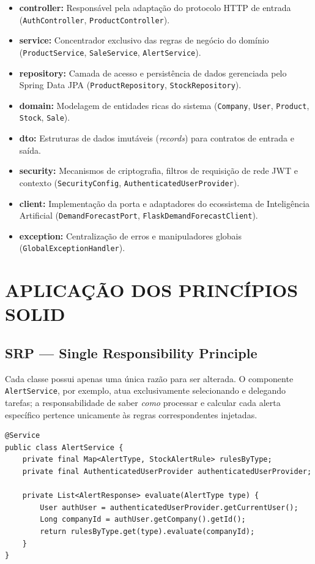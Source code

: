 \documentclass[12pt,a4paper]{article}
\begin{document}
\begin{itemize}
    \item \textbf{controller:} Responsável pela adaptação do protocolo HTTP de entrada (\texttt{AuthController}, \texttt{ProductController}).
    \item \textbf{service:} Concentrador exclusivo das regras de negócio do domínio (\texttt{ProductService}, \texttt{SaleService}, \texttt{AlertService}).
    \item \textbf{repository:} Camada de acesso e persistência de dados gerenciada pelo Spring Data JPA (\texttt{ProductRepository}, \texttt{StockRepository}).
    \item \textbf{domain:} Modelagem de entidades ricas do sistema (\texttt{Company}, \texttt{User}, \texttt{Product}, \texttt{Stock}, \texttt{Sale}).
    \item \textbf{dto:} Estruturas de dados imutáveis (\textit{records}) para contratos de entrada e saída.
    \item \textbf{security:} Mecanismos de criptografia, filtros de requisição de rede JWT e contexto (\texttt{SecurityConfig}, \texttt{AuthenticatedUserProvider}).
    \item \textbf{client:} Implementação da porta e adaptadores do ecossistema de Inteligência Artificial (\texttt{DemandForecastPort}, \texttt{FlaskDemandForecastClient}).
    \item \textbf{exception:} Centralização de erros e manipuladores globais (\texttt{GlobalExceptionHandler}).
\end{itemize}

\newpage
\section{APLICAÇÃO DOS PRINCÍPIOS SOLID}

\subsection{SRP — Single Responsibility Principle}
Cada classe possui apenas uma única razão para ser alterada. O componente \texttt{AlertService}, por exemplo, atua exclusivamente selecionando e delegando tarefas; a responsabilidade de saber \textit{como} processar e calcular cada alerta específico pertence unicamente às regras correspondentes injetadas.

\begin{lstlisting}
@Service
public class AlertService {
    private final Map<AlertType, StockAlertRule> rulesByType;
    private final AuthenticatedUserProvider authenticatedUserProvider;

    private List<AlertResponse> evaluate(AlertType type) {
        User authUser = authenticatedUserProvider.getCurrentUser();
        Long companyId = authUser.getCompany().getId();
        return rulesByType.get(type).evaluate(companyId);
    }
}
\end{lstlisting}
\end{document}
